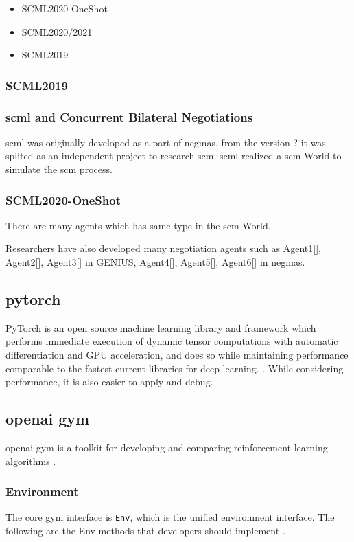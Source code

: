 \begin{itemize}
	\item SCML2020-OneShot
	\item SCML2020/2021
	\item SCML2019
\end{itemize}

\subsubsection{SCML2019}

\subsubsection{\gls{scml} and Concurrent Bilateral Negotiations}
\gls{scml} was originally developed as a part of \gls{negmas}, from the version ? it was splited as an independent project to research \gls{scm}. \gls{scml} realized a \gls{scm} World to simulate the \gls{scm} process.  

\subsubsection{SCML2020-OneShot}


There are many agents which has same type in the \gls{scm} World. 

Researchers have also developed many negotiation agents such as Agent1[], Agent2[], Agent3[] in GENIUS, Agent4[], Agent5[], Agent6[] in \gls{negmas}.

\subsection{\gls{pytorch}} PyTorch is an open source machine learning library and framework which performs immediate execution of dynamic tensor computations with automatic differentiation and GPU acceleration, and does so while maintaining performance comparable to the fastest current libraries for deep learning. \parencite{NEURIPS2019_bdbca288}. While considering performance, it is also easier to apply and debug.

\subsection{\gls{openai gym}}
\gls{openai gym} is a toolkit for developing and comparing reinforcement learning algorithms \parencite{brockman2016openai}.
\subsubsection{Environment}
The core gym interface is \texttt{Env}, which is the unified environment interface. The following are the Env methods that developers should implement \parencite{brockman2016openai}.

